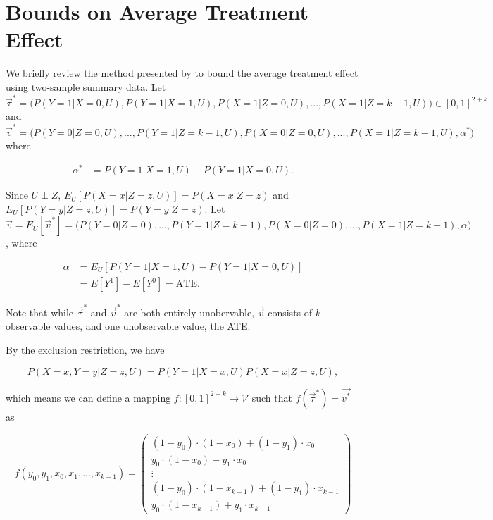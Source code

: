 \documentclass[AMA,STIX1COL,]{WileyNJD-v2}
\begin{document}
\hypertarget{bounds-on-average-treatment-effect}{%
\section{Bounds on Average Treatment
Effect}\label{bounds-on-average-treatment-effect}}

\label{bounds-on-average-treatment-effect}

We briefly review the method presented by \citep{ramsahai_causal_2012}
to bound the average treatment effect using two-sample summary data. Let
\(\vec{\tau}^* = \Big(P(Y = 1 | X = 0, U), P(Y = 1 | X = 1, U), P(X = 1 | Z = 0, U), ..., P(X = 1 | Z = k-1, U)\Big) \in [0,1]^{2+k}\)
and
\(\vec{v}^* = \Big(P(Y = 0 | Z = 0, U), ..., P(Y = 1 | Z = k-1, U), P(X = 0 | Z = 0, U), ..., P(X = 1 | Z = k-1, U), \alpha^*\Big)\)
where

\[
\begin{aligned}
\alpha^* &= P(Y = 1 | X = 1, U) - P(Y = 1 | X = 0, U).
\end{aligned}
\]

Since \(U \perp Z\), \(E_U[P(X = x | Z = z, U)] = P(X = x | Z = z)\) and
\(E_U[P(Y = y | Z = z, U)] = P(Y = y | Z = z)\). Let
\(\vec{v} = E_U[\vec{v}^*] = \Big(P(Y = 0 | Z = 0), ..., P(Y = 1 | Z = k-1), P(X = 0 | Z = 0), ..., P(X = 1 | Z = k-1), \alpha \Big)\),
where

\[
\begin{aligned}
\alpha &= E_U[P(Y = 1 | X = 1, U) - P(Y = 1 | X = 0, U)] \\
       &= E[Y^1] - E[Y^0] = \text{ATE}.
\end{aligned}
\]

Note that while \(\vec{\tau}^*\) and \(\vec{v}^*\) are both entirely
unobervable, \(\vec{v}\) consists of \(k\) observable values, and one
unobservable value, the ATE.

By the exclusion restriction, we have

\[
P(X = x, Y = y | Z = z, U) = P(Y = 1 | X = x, U) P(X = x | Z = z, U),
\]

which means we can define a mapping
\(f:[0,1]^{2+k} \mapsto \mathcal{V}\) such that
\(f(\vec{\tau}^*) = \vec{v^*}\) as

\[
f(y_0, y_1, x_0, x_1, ..., x_{k-1}) =
  \begin{pmatrix}
    (1-y_0)\cdot(1-x_0) + (1 - y_1)\cdot x_0 \\
    y_0\cdot (1-x_0) + y_1\cdot x_0 \\
    \vdots \\
    (1-y_0)\cdot(1-x_{k-1}) + (1 - y_1)\cdot x_{k-1} \\
    y_0\cdot (1-x_{k-1}) + y_1\cdot x_{k-1}
  \end{pmatrix} \label{eq:f}
\]
\end{document}
